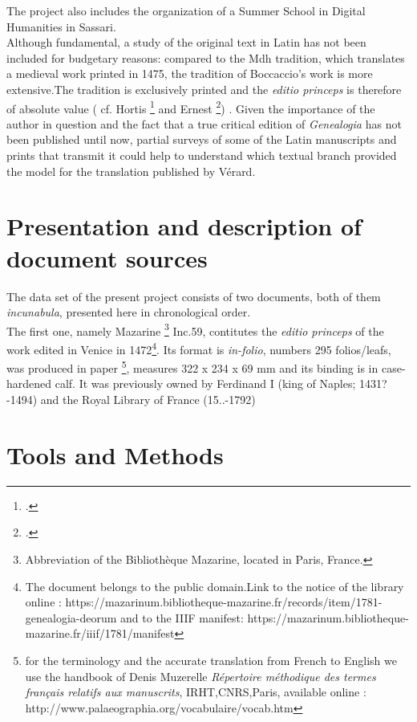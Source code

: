 \documentclass[12pt,twoside]{article}
\begin{document}
The project also includes  the organization of a Summer School in Digital Humanities in Sassari. \\


Although fundamental, a study of the original text in Latin has not been included for budgetary reasons: compared to the Mdh tradition, which translates a medieval work printed in 1475, the tradition of Boccaccio's work is more extensive.The tradition is exclusively printed and the \textit{editio princeps} is therefore of absolute value ( cf. Hortis \footcite{hortis1879} and Ernest \footcite{ernest1919}) . Given the importance of the author in question and the fact that a true critical edition of \textit{Genealogia} has not been published until now, partial surveys of some of the Latin manuscripts and prints that transmit it could help to understand which textual branch provided the model for the translation published by Vérard.

\clearpage

\section{Presentation and description of document sources}

The data set of the present project consists of two documents, both of them \textit{incunabula}, presented here in chronological order.\\
The first one, namely Mazarine \footnote{Abbreviation of the Bibliothèque Mazarine, located in Paris, France.} Inc.59, contitutes the \textit{editio princeps} of the work edited in Venice in 1472\footnote{The document belongs to the public domain.Link to the notice of the library online : https://mazarinum.bibliotheque-mazarine.fr/records/item/1781-genealogia-deorum and to the IIIF manifest:  https://mazarinum.bibliotheque-mazarine.fr/iiif/1781/manifest}. Its format is \textit{in-folio}, numbers 295 folios/leafs, was produced in paper \footnote{for the terminology and the accurate translation from French to English we use the handbook of Denis Muzerelle \textit{Répertoire méthodique
des termes français
relatifs aux manuscrits}, IRHT,CNRS,Paris, available online : http://www.palaeographia.org/vocabulaire/vocab.htm }, measures 322 x 234 x 69 mm and its binding is in case-hardened calf. It was previously owned by Ferdinand I (king of Naples; 1431?-1494) and the
Royal Library of France (15..-1792)\\ 


\clearpage
\section{Tools and Methods}
\end{document}

